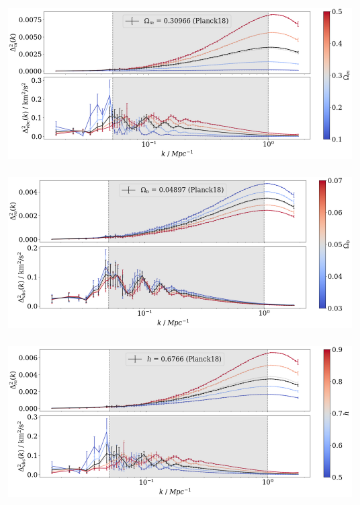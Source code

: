 \documentclass[floats,floatfix,showpacs,amssymb,prd,superscriptaddress,nofootinbib]{revtex4-2} %
\begin{document}
\begin{figure}[H]
     \centering
     \begin{subfigure}[b]{0.9\textwidth}
         \centering
         \includegraphics[width=\textwidth]{images/ic_power_spectra/compare_cosmologies_averaged_power_spectra_Om.png}
     \end{subfigure}
     \hfill
     \begin{subfigure}[b]{0.9\textwidth}
         \centering
         \includegraphics[width=\textwidth]{images/ic_power_spectra/compare_cosmologies_averaged_power_spectra_Ob.png}
     \end{subfigure}
     \hfill
     \begin{subfigure}[b]{0.9\textwidth}
         \centering
         \includegraphics[width=\textwidth]{images/ic_power_spectra/compare_cosmologies_averaged_power_spectra_h.png}

\end{subfigure}
\end{figure}
\end{document}
